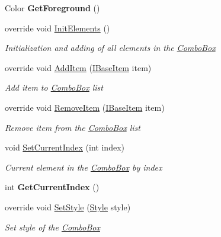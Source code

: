 \begin{DoxyCompactItemize}
\item 
\mbox{\label{class_space_v_i_l_1_1_combo_box_a3fefa5ed1de819e0c22b550ad8f9692f}} 
Color {\bfseries Get\+Foreground} ()
\item 
override void \mbox{\hyperlink{class_space_v_i_l_1_1_combo_box_af43d1181237882f92c25cf60cb67233a}{Init\+Elements}} ()
\begin{DoxyCompactList}\small\item\em Initialization and adding of all elements in the \mbox{\hyperlink{class_space_v_i_l_1_1_combo_box}{Combo\+Box}} \end{DoxyCompactList}\item 
override void \mbox{\hyperlink{class_space_v_i_l_1_1_combo_box_a05b737bc6384aa858fe63ffe5cc03afd}{Add\+Item}} (\mbox{\hyperlink{interface_space_v_i_l_1_1_core_1_1_i_base_item}{I\+Base\+Item}} item)
\begin{DoxyCompactList}\small\item\em Add item to \mbox{\hyperlink{class_space_v_i_l_1_1_combo_box}{Combo\+Box}} list \end{DoxyCompactList}\item 
override void \mbox{\hyperlink{class_space_v_i_l_1_1_combo_box_a646108f1b822d481ae32b68e7bd3f44f}{Remove\+Item}} (\mbox{\hyperlink{interface_space_v_i_l_1_1_core_1_1_i_base_item}{I\+Base\+Item}} item)
\begin{DoxyCompactList}\small\item\em Remove item from the \mbox{\hyperlink{class_space_v_i_l_1_1_combo_box}{Combo\+Box}} list \end{DoxyCompactList}\item 
void \mbox{\hyperlink{class_space_v_i_l_1_1_combo_box_a9e06cbc4b358a4e145284ed396da159b}{Set\+Current\+Index}} (int index)
\begin{DoxyCompactList}\small\item\em Current element in the \mbox{\hyperlink{class_space_v_i_l_1_1_combo_box}{Combo\+Box}} by index \end{DoxyCompactList}\item 
\mbox{\label{class_space_v_i_l_1_1_combo_box_ae0ccc820590a58c1c1c568cfcc31a697}} 
int {\bfseries Get\+Current\+Index} ()
\item 
override void \mbox{\hyperlink{class_space_v_i_l_1_1_combo_box_a5aaf1e459ca198f19c8bc4805f5f3b10}{Set\+Style}} (\mbox{\hyperlink{class_space_v_i_l_1_1_decorations_1_1_style}{Style}} style)
\begin{DoxyCompactList}\small\item\em Set style of the \mbox{\hyperlink{class_space_v_i_l_1_1_combo_box}{Combo\+Box}} \end{DoxyCompactList}\end{DoxyCompactItemize}
